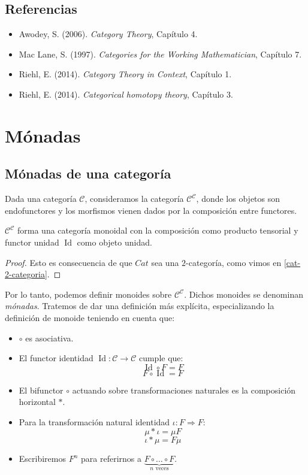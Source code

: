\documentclass[12pt, twoside]{book}
\newcommand{\newterm}[1]{\index{#1}\emph{#1}}
\newcommand{\cat}{{\mathcal{C}}}
\newcommand{\Cat}{{Cat}}
\DeclareMathOperator{\Id}{Id}
\begin{document}
\section{Referencias}
\begin{itemize}
  \item Awodey, S. (2006). \emph{Category Theory}, Capítulo 4.
  \item Mac Lane, S. (1997). \emph{Categories for the Working Mathematician}, Capítulo 7.
  \item Riehl, E. (2014). \emph{Category Theory in Context}, Capítulo 1.
  \item Riehl, E. (2014). \emph{Categorical homotopy theory}, Capítulo 3.
\end{itemize}

\chapter{Mónadas}
\section{Mónadas de una categoría}
Dada una categoría $\cat$, consideramos la categoría $\cat^\cat$, donde los objetos son endofunctores y los morfismos vienen dados por la composición entre functores.

\begin{proposition}
$\cat^\cat$ forma una categoría monoidal con la composición como producto tensorial y functor unidad $\Id$ como objeto unidad.
\end{proposition}
\begin{proof}
Esto es consecuencia de que $\Cat$ sea una $2$-categoría, como vimos en \ref{cat-2-categoria}.
\end{proof}

Por lo tanto, podemos definir monoides sobre $\cat^\cat$.
Dichos monoides se denominan \newterm{mónadas}.
Tratemos de dar una definición más explícita, especializando la definición de monoide teniendo en cuenta que:
\begin{itemize}
  \item $\circ$ es asociativa.
  \item El functor identidad $\Id \colon \cat \to \cat$ cumple que:
\[ \Id \circ F = F \]
\[ F \circ \Id = F\]
  \item El bifunctor $\circ$ actuando sobre transformaciones naturales es la composición horizontal $*$.
  \item Para la transformación natural identidad $\iota \colon F \Rightarrow F$:
\[ \mu * \iota = \mu F \]
\[ \iota * \mu = F \mu \]
  \item Escribiremos $F^n$ para referirnos a $\underbrace{F \circ \dots \circ F}_{n \text{ veces}}$.
\end{itemize}
\end{document}
